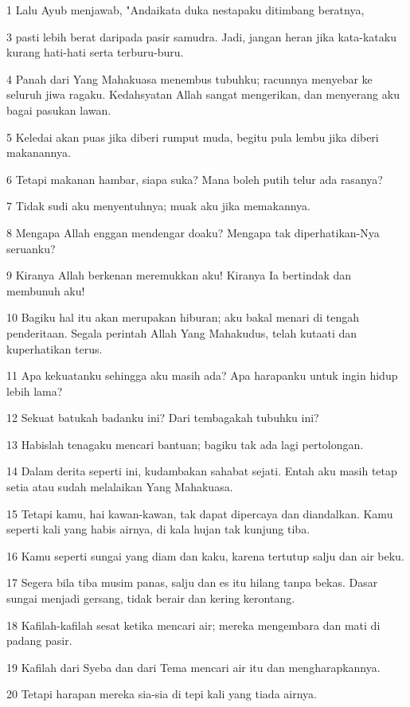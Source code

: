 \par 1 Lalu Ayub menjawab, "Andaikata duka nestapaku ditimbang beratnya,
\par 3 pasti lebih berat daripada pasir samudra. Jadi, jangan heran jika kata-kataku kurang hati-hati serta terburu-buru.
\par 4 Panah dari Yang Mahakuasa menembus tubuhku; racunnya menyebar ke seluruh jiwa ragaku. Kedahsyatan Allah sangat mengerikan, dan menyerang aku bagai pasukan lawan.
\par 5 Keledai akan puas jika diberi rumput muda, begitu pula lembu jika diberi makanannya.
\par 6 Tetapi makanan hambar, siapa suka? Mana boleh putih telur ada rasanya?
\par 7 Tidak sudi aku menyentuhnya; muak aku jika memakannya.
\par 8 Mengapa Allah enggan mendengar doaku? Mengapa tak diperhatikan-Nya seruanku?
\par 9 Kiranya Allah berkenan meremukkan aku! Kiranya Ia bertindak dan membunuh aku!
\par 10 Bagiku hal itu akan merupakan hiburan; aku bakal menari di tengah penderitaan. Segala perintah Allah Yang Mahakudus, telah kutaati dan kuperhatikan terus.
\par 11 Apa kekuatanku sehingga aku masih ada? Apa harapanku untuk ingin hidup lebih lama?
\par 12 Sekuat batukah badanku ini? Dari tembagakah tubuhku ini?
\par 13 Habislah tenagaku mencari bantuan; bagiku tak ada lagi pertolongan.
\par 14 Dalam derita seperti ini, kudambakan sahabat sejati. Entah aku masih tetap setia atau sudah melalaikan Yang Mahakuasa.
\par 15 Tetapi kamu, hai kawan-kawan, tak dapat dipercaya dan diandalkan. Kamu seperti kali yang habis airnya, di kala hujan tak kunjung tiba.
\par 16 Kamu seperti sungai yang diam dan kaku, karena tertutup salju dan air beku.
\par 17 Segera bila tiba musim panas, salju dan es itu hilang tanpa bekas. Dasar sungai menjadi gersang, tidak berair dan kering kerontang.
\par 18 Kafilah-kafilah sesat ketika mencari air; mereka mengembara dan mati di padang pasir.
\par 19 Kafilah dari Syeba dan dari Tema mencari air itu dan mengharapkannya.
\par 20 Tetapi harapan mereka sia-sia di tepi kali yang tiada airnya.
